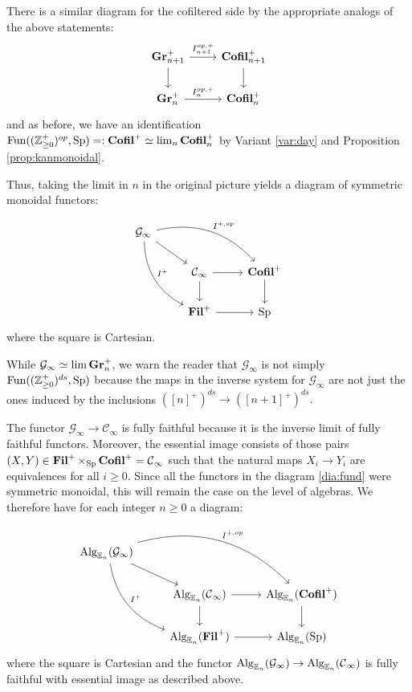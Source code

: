 There is a similar diagram for the cofiltered side by the appropriate analogs of the above statements:
$$
\begin{tikzcd}
\Gr_{n+1}^+ \arrow[r,"I_{n+1}^{op,+}"] \arrow[d] & \Cofil_{n+1}^+ \arrow[d]\\
\Gr_n^+  \arrow[r,"I_n^{op,+}"] & \Cofil_n^+ 
\end{tikzcd}
$$
and as before, we have an identification $ \operatorname{\text{Fun}}((\operatorname{\mathbb{Z}}_{\geq 0}^{+})^{op}, \operatorname{\text{Sp}}) =: \operatorname{\textbf{Cofil}}^+ \simeq \lim_n \operatorname{\textbf{Cofil}}_n^+$ by Variant \ref{var:day} and Proposition \ref{prop:kanmonoidal}.

Thus, taking the limit in $n$ in the original picture yields a diagram of symmetric monoidal functors:

\begin{equation}\label{dia:fund}
\begin{tikzcd}
\mathcal{G}_\infty
 \arrow[drr, bend left, "I^{+,op}"]
  \arrow[ddr, bend right, "I^+"]
  \arrow[dr] & & \\
&\C_\infty \arrow[r] \arrow[d]&  \Cofil^+ \arrow[d]\\
& \Fil^+ \arrow[r]& \Sp
\end{tikzcd}
\end{equation}
where the square is Cartesian.

\begin{rmk}
While $\mathcal{G}_\infty \simeq \lim \operatorname{\textbf{Gr}}_n^{+}$, we warn the reader that $\mathcal{G}_\infty$ is not simply $\operatorname{\text{Fun}}((\operatorname{\mathbb{Z}}_{\geq 0}^+)^{ds}, \operatorname{\text{Sp}})$ because the maps in the inverse system for $\mathcal{G}_\infty$ are not just the ones induced by the inclusions $([n]^+)^{ds} \to ([n+1]^+)^{ds}.$
\end{rmk}

The functor $\mathcal{G}_\infty \to \mathcal{C}_\infty$ is fully faithful because it is the inverse limit of fully faithful functors.  Moreover, the essential image consists of those pairs $(X,Y)\in \operatorname{\textbf{Fil}}^+\times_{\operatorname{\text{Sp}}} \operatorname{\textbf{Cofil}}^+ = \operatorname{\mathcal{C}}_{\infty}$ such that the natural maps $X_i\to Y_i$ are equivalences for all $i\geq 0$.   Since all the functors in the diagram \ref{dia:fund} were symmetric monoidal, this will remain the case on the level of algebras.  We therefore have for each integer $n\geq 0$ a diagram:

\begin{equation}\label{dia:fundmon}
\begin{tikzcd}
\Alg_{\E_n}(\mathcal{G}_\infty)
 \arrow[drr, bend left, "I^{+,op}"]
  \arrow[ddr, bend right, "I^+"]
  \arrow[dr] & & \\
&\Alg_{\E_n}(\C_\infty) \arrow[r] \arrow[d]&  \Alg_{\E_n}(\Cofil^+ )\arrow[d]\\
& \Alg_{\E_n}(\Fil^+ )\arrow[r]& \Alg_{\E_n}(\Sp)
\end{tikzcd}
\end{equation}
where the square is Cartesian and the functor $\operatorname{\text{Alg}}_{\operatorname{\mathbb{E}}_n}(\mathcal{G}_\infty) \to \operatorname{\text{Alg}}_{\operatorname{\mathbb{E}}_n}(\operatorname{\mathcal{C}}_\infty)$ is fully faithful with essential image as described above.  


